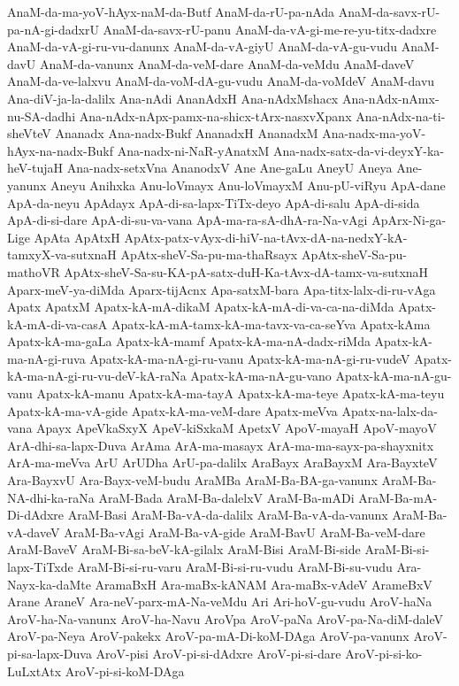 {AnaM-da-ma-yoV-hAyx-naM-da-Butf
AnaM-da-rU-pa-nAda
AnaM-da-savx-rU-pa-nA-gi-dadxrU
AnaM-da-savx-rU-panu
AnaM-da-vA-gi-me-re-yu-titx-dadxre
AnaM-da-vA-gi-ru-vu-danunx
AnaM-da-vA-giyU
AnaM-da-vA-gu-vudu
AnaM-davU
AnaM-da-vanunx
AnaM-da-veM-dare
AnaM-da-veMdu
AnaM-daveV
AnaM-da-ve-lalxvu
AnaM-da-voM-dA-gu-vudu
AnaM-da-voMdeV
AnaM-davu
Ana-diV-ja-la-dalilx
Ana-nAdi
AnanAdxH
Ana-nAdxMshacx
Ana-nAdx-nAmx-nu-SA-dadhi
Ana-nAdx-nApx-pamx-na-shicx-tArx-nasxvXpanx
Ana-nAdx-na-ti-sheVteV
Ananadx
Ana-nadx-Bukf
AnanadxH
AnanadxM
Ana-nadx-ma-yoV-hAyx-na-nadx-Bukf
Ana-nadx-ni-NaR-yAnatxM
Ana-nadx-satx-da-vi-deyxY-ka-heV-tujaH
Ana-nadx-setxVna
AnanodxV
Ane
Ane-gaLu
AneyU
Aneya
Ane-yanunx
Aneyu
Anihxka
Anu-loVmayx
Anu-loVmayxM
Anu-pU-viRyu
ApA-dane
ApA-da-neyu
ApAdayx
ApA-di-sa-lapx-TiTx-deyo
ApA-di-salu
ApA-di-sida
ApA-di-si-dare
ApA-di-su-va-vana
ApA-ma-ra-sA-dhA-ra-Na-vAgi
ApArx-Ni-ga-Lige
ApAta
ApAtxH
ApAtx-patx-vAyx-di-hiV-na-tAvx-dA-na-nedxY-kA-tamxyX-va-sutxnaH
ApAtx-sheV-Sa-pu-ma-thaRsayx
ApAtx-sheV-Sa-pu-mathoVR
ApAtx-sheV-Sa-su-KA-pA-satx-duH-Ka-tAvx-dA-tamx-va-sutxnaH
Aparx-meV-ya-diMda
Aparx-tijAcnx
Apa-satxM-bara
Apa-titx-lalx-di-ru-vAga
Apatx
ApatxM
Apatx-kA-mA-dikaM
Apatx-kA-mA-di-va-ca-na-diMda
Apatx-kA-mA-di-va-casA
Apatx-kA-mA-tamx-kA-ma-tavx-va-ca-seYva
Apatx-kAma
Apatx-kA-ma-gaLa
Apatx-kA-mamf
Apatx-kA-ma-nA-dadx-riMda
Apatx-kA-ma-nA-gi-ruva
Apatx-kA-ma-nA-gi-ru-vanu
Apatx-kA-ma-nA-gi-ru-vudeV
Apatx-kA-ma-nA-gi-ru-vu-deV-kA-raNa
Apatx-kA-ma-nA-gu-vano
Apatx-kA-ma-nA-gu-vanu
Apatx-kA-manu
Apatx-kA-ma-tayA
Apatx-kA-ma-teye
Apatx-kA-ma-teyu
Apatx-kA-ma-vA-gide
Apatx-kA-ma-veM-dare
Apatx-meVva
Apatx-na-lalx-da-vana
Apayx
ApeVkaSxyX
ApeV-kiSxkaM
ApetxV
ApoV-mayaH
ApoV-mayoV
ArA-dhi-sa-lapx-Duva
ArAma
ArA-ma-masayx
ArA-ma-ma-sayx-pa-shayxnitx
ArA-ma-meVva
ArU
ArUDha
ArU-pa-dalilx
AraBayx
AraBayxM
Ara-BayxteV
Ara-BayxvU
Ara-Bayx-veM-budu
AraMBa
AraM-Ba-BA-ga-vanunx
AraM-Ba-NA-dhi-ka-raNa
AraM-Bada
AraM-Ba-dalelxV
AraM-Ba-mADi
AraM-Ba-mA-Di-dAdxre
AraM-Basi
AraM-Ba-vA-da-dalilx
AraM-Ba-vA-da-vanunx
AraM-Ba-vA-daveV
AraM-Ba-vAgi
AraM-Ba-vA-gide
AraM-BavU
AraM-Ba-veM-dare
AraM-BaveV
AraM-Bi-sa-beV-kA-gilalx
AraM-Bisi
AraM-Bi-side
AraM-Bi-si-lapx-TiTxde
AraM-Bi-si-ru-varu
AraM-Bi-si-ru-vudu
AraM-Bi-su-vudu
Ara-Nayx-ka-daMte
AramaBxH
Ara-maBx-kANAM
Ara-maBx-vAdeV
ArameBxV
Arane
AraneV
Ara-neV-parx-mA-Na-veMdu
Ari
Ari-hoV-gu-vudu
AroV-haNa
AroV-ha-Na-vanunx
AroV-ha-Navu
AroVpa
AroV-paNa
AroV-pa-Na-diM-daleV
AroV-pa-Neya
AroV-pakekx
AroV-pa-mA-Di-koM-DAga
AroV-pa-vanunx
AroV-pi-sa-lapx-Duva
AroV-pisi
AroV-pi-si-dAdxre
AroV-pi-si-dare
AroV-pi-si-ko-LuLxtAtx
AroV-pi-si-koM-DAga
}
